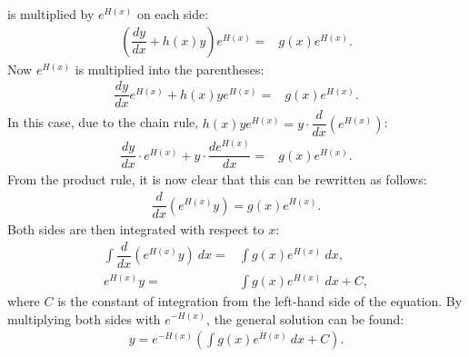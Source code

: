\begin{prof}{}{}
 is multiplied by $e^{H(x)}$ on each side:
\begin{align*}
\left(\dfrac{dy}{dx}+h(x)y\right)e^{H(x)}=& g(x)e^{H(x)}.
\end{align*}
Now $e^{H(x)}$ is multiplied into the parentheses:
\begin{align*}
\dfrac{dy}{dx}e^{H(x)}+h(x)ye^{H(x)}=& g(x)e^{H(x)}.
\end{align*}
In this case, due to the chain rule, $h(x)ye^{H(x)} = y \cdot \dfrac{d}{dx} \left(e^{H(x)} \right)$:
\begin{align*}
\dfrac{dy}{dx} \cdot e^{H(x)} + y \cdot \dfrac{de^{H(x)}}{dx}=& g(x)e^{H(x)}.
\end{align*}
From the product rule, it is now clear that this can be rewritten as follows:
\begin{align*}
\dfrac{d}{dx}\left(e^{H(x)}y\right)=g(x)e^{H(x)}.
\end{align*}
Both sides are then integrated with respect to $x$:
\begin{align*}
\int\dfrac{d}{dx}\left(e^{H(x)}y\right)\ dx=&\int g(x)e^{H(x)}\ dx,
\\
e^{H(x)}y=&\int g(x)e^{H(x)}\ dx+C,
\end{align*}
where $C$ is the constant of integration from the left-hand side of the  equation. By multiplying both sides with $e^{-H(x)}$, the general solution can be found:
\begin{align*}
y=e^{-H(x)}\left(\int g(x)e^{H(x)}\ dx+C\right).
\end{align*}
\end{prof}

